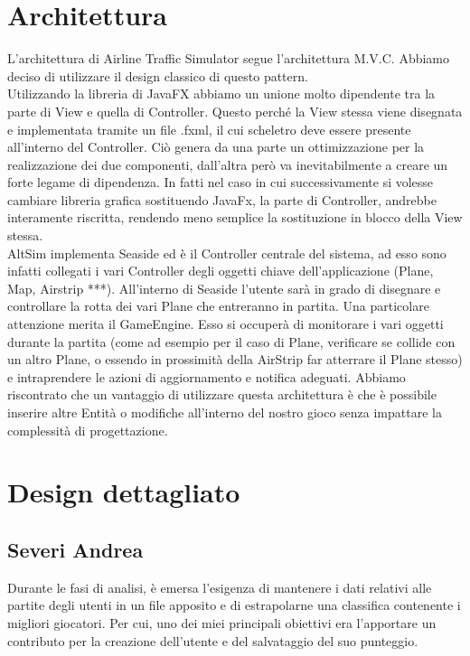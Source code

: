 \documentclass[a4paper,12pt]{report}
\begin{document}
\section{Architettura}
L’architettura di Airline Traffic Simulator segue l’architettura M.V.C. \newline
Abbiamo deciso di utilizzare il design classico di questo pattern.
\\
Utilizzando la libreria di JavaFX abbiamo un unione molto dipendente tra la parte di View e quella di Controller.
Questo perché la View stessa viene disegnata e implementata tramite un file .fxml, il cui scheletro deve essere presente all’interno del Controller.
Ciò genera da una parte un ottimizzazione per la realizzazione dei due componenti, dall’altra però va inevitabilmente a creare un forte legame di dipendenza.
In fatti nel caso in cui successivamente si volesse cambiare libreria grafica sostituendo JavaFx, la parte di Controller, andrebbe interamente riscritta, rendendo meno semplice la sostituzione in blocco della View stessa.
\\
AltSim implementa Seaside ed è il Controller centrale del sistema, ad esso sono infatti collegati i vari Controller degli oggetti chiave dell’applicazione (Plane, Map, Airstrip ***). 
All’interno di Seaside l’utente sarà in grado di disegnare e controllare la rotta dei vari Plane che entreranno in partita.
Una particolare attenzione merita il GameEngine.
Esso si occuperà di monitorare i vari oggetti durante la partita (come ad esempio per il caso di Plane, verificare se collide con un altro Plane, o essendo in prossimità della AirStrip far atterrare il Plane stesso) e intraprendere le azioni di aggiornamento e notifica adeguati. Abbiamo riscontrato che un vantaggio di utilizzare questa architettura è che è possibile inserire altre Entità o modifiche all’interno del nostro gioco senza impattare la complessità di progettazione.

\clearpage

\section{Design dettagliato}
\subsection{Severi Andrea}
Durante le fasi di analisi, è emersa l'esigenza di mantenere i dati relativi alle partite degli utenti in un file apposito e di estrapolarne una classifica contenente i migliori giocatori. Per cui, uno dei miei principali obiettivi era l'apportare un contributo per la creazione dell'utente e del salvataggio del suo punteggio.
\end{document}
